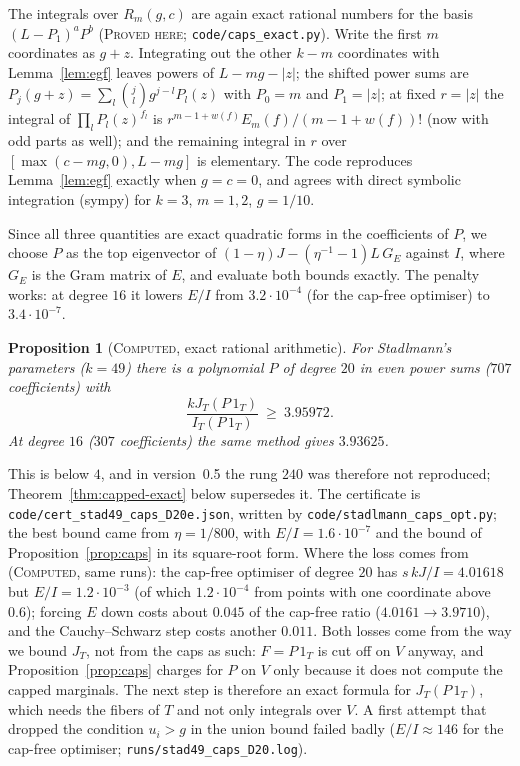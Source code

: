 \documentclass[11pt]{amsart}
\newtheorem{proposition}[theorem]{Proposition}
\theoremstyle{definition}
\theoremstyle{remark}
\newcommand{\lbl}[1]{\textup{\textsc{#1}}}
\begin{document}
The integrals over $R_m(g,c)$ are again exact rational numbers for the basis
$(L-P_1)^aP^b$ (\lbl{Proved here}; \texttt{code/caps\_exact.py}). Write the
first $m$ coordinates as $g+z$. Integrating out the other $k-m$ coordinates
with Lemma~\ref{lem:egf} leaves powers of $L-mg-|z|$; the shifted power sums
are $P_j(g+z)=\sum_l\binom jlg^{j-l}P_l(z)$ with $P_0=m$ and $P_1=|z|$; at
fixed $r=|z|$ the integral of $\prod_lP_l(z)^{f_l}$ is
$r^{m-1+w(f)}E_m(f)/(m-1+w(f))!$ (now with odd parts as well); and the
remaining integral in $r$ over $[\max(c-mg,0),L-mg]$ is elementary. The code
reproduces Lemma~\ref{lem:egf} exactly when $g=c=0$, and agrees with direct
symbolic integration (sympy) for $k=3$, $m=1,2$, $g=1/10$.

Since all three quantities are exact quadratic forms in the coefficients of
$P$, we choose $P$ as the top eigenvector of
$(1-\eta)J-(\eta^{-1}-1)L\,G_E$ against $I$, where $G_E$ is the Gram matrix of
$E$, and evaluate both bounds exactly. The penalty works: at degree $16$ it
lowers $E/I$ from $3.2\cdot10^{-4}$ (for the cap-free optimiser) to
$3.4\cdot10^{-7}$.

\begin{proposition}[\lbl{Computed}, exact rational arithmetic]\label{prop:capped}
For Stadlmann's parameters ($k=49$) there is a polynomial $P$ of degree $20$
in even power sums ($707$ coefficients) with
\[
\frac{kJ_T(P\,1_T)}{I_T(P\,1_T)}\ \ge\ 3.95972 .
\]
At degree $16$ ($307$ coefficients) the same method gives $3.93625$.
\end{proposition}

\begin{sloppypar}
This is below $4$, and in version~0.5 the rung $240$ was therefore not
reproduced; Theorem~\ref{thm:capped-exact} below supersedes it. The certificate is
\texttt{code/cert\_stad49\_caps\_D20e.json}, written by
\texttt{code/stadlmann\_caps\_opt.py}; the best bound came from
$\eta=1/800$, with $E/I=1.6\cdot10^{-7}$ and the bound of
Proposition~\ref{prop:caps} in its square-root form. Where the loss comes from
(\lbl{Computed}, same runs): the cap-free optimiser of degree $20$ has
$s\,kJ/I=4.01618$ but $E/I=1.2\cdot10^{-3}$ (of which $1.2\cdot10^{-4}$ from points with one
coordinate above $0.6$); forcing $E$ down costs about $0.045$ of the cap-free
ratio ($4.0161\to3.9710$), and the Cauchy--Schwarz step costs another
$0.011$. Both losses come from the way we bound $J_T$, not from the caps as
such: $F=P\,1_T$ is cut off on $V$ anyway, and Proposition~\ref{prop:caps}
charges for $P$ on $V$ only because it does not compute the capped marginals.
The next step is therefore an exact formula for $J_T(P\,1_T)$, which needs the
fibers of $T$ and not only integrals over $V$. A first attempt that dropped the
condition $u_i>g$ in the union bound failed badly ($E/I\approx146$ for the
cap-free optimiser; \texttt{runs/stad49\_caps\_D20.log}).
\end{sloppypar}
\end{document}
